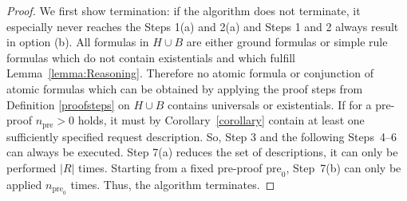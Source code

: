 \begin{proof}
We first show termination:
if the algorithm does not terminate, it especially never reaches the Steps 1(a) and 2(a) and
%
Steps 1 and 2 always result in option (b). 
All formulas in $H\cup B$ are either ground formulas
or simple rule formulas %
which do not contain existentials 
and which fulfill Lemma~\ref{lemma:Reasoning}.
Therefore no atomic formula or conjunction of atomic formulas
which can be obtained by applying the proof steps from Definition \ref{proofsteps}
on $H\cup B$
contains universals %
or existentials.
If for a pre-proof $n_{\text{pre}}>0$ holds, it must 
by Corollary~\ref{corollary} %
contain at least one
sufficiently specified \http request description. So, Step 3 and the following Steps~4--6 can always be executed.
Step 7(a) reduces the set of \restdesc descriptions, it can only be performed $|R|$ times.
Starting from a fixed pre-proof $\text{pre}_0$, Step~7(b) can only be applied $n_{\text{pre}_0}$ times.
Thus, the algorithm terminates.%


\end{proof}
